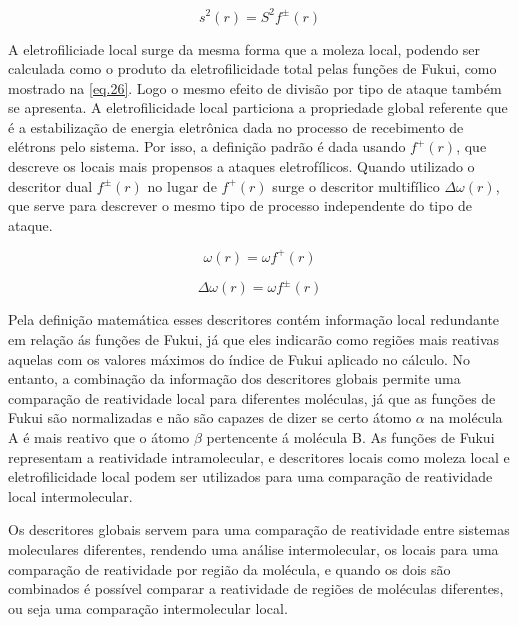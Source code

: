 \documentclass[a4paper,11pt]{refart}
\begin{document}
\begin{equation}
s^{2}(r) = S^2f^{\pm}(r)
\label{eq.25}
\end{equation}


A eletrofiliciade local surge da mesma forma que a moleza local, podendo ser calculada como o produto da eletrofilicidade total pelas funções de Fukui\cite{noorizadeh2013evaluation}, como mostrado na \autoref{eq.26}. Logo o mesmo efeito de divisão por tipo de ataque também se apresenta. A eletrofilicidade local particiona a propriedade global referente que é a estabilização de energia eletrônica dada no processo de recebimento de elétrons pelo sistema. Por isso, a definição padrão é dada usando $f^+(r)$, que descreve os locais mais propensos a ataques eletrofílicos. Quando utilizado o descritor dual $f^{\pm}(r)$ no lugar de $f^+(r)$ surge o descritor multifílico  $\Delta \omega(r)$, que serve para descrever o mesmo tipo de processo independente do tipo de ataque\cite{padmanabhan2007multiphilic}.

\begin{equation}
\omega(r) = \omega f^+(r)
\label{eq.26}
\end{equation}

\begin{equation}
\Delta \omega(r) = \omega f^{\pm}(r)
\label{eq.27}
\end{equation}

Pela definição matemática esses descritores contém informação local redundante em relação ás funções de Fukui, já que eles indicarão como regiões mais reativas aquelas com os valores máximos do índice de Fukui aplicado no cálculo. No entanto, a combinação da informação dos descritores globais permite uma comparação de reatividade local para diferentes moléculas, já que as funções de Fukui são normalizadas e não são capazes de dizer se certo átomo $\alpha$ na molécula A é mais reativo que o átomo $\beta$ pertencente á molécula B\cite{Roy1998}. As funções de Fukui representam a reatividade intramolecular, e descritores locais como moleza local e eletrofilicidade local podem ser utilizados para uma comparação de reatividade local intermolecular. 

Os descritores globais servem para uma comparação de reatividade entre sistemas moleculares diferentes, rendendo uma análise intermolecular, os locais para uma comparação de reatividade por região da molécula, e quando os dois são combinados é possível comparar a reatividade de regiões de moléculas diferentes, ou seja uma comparação intermolecular local. 
\end{document}
